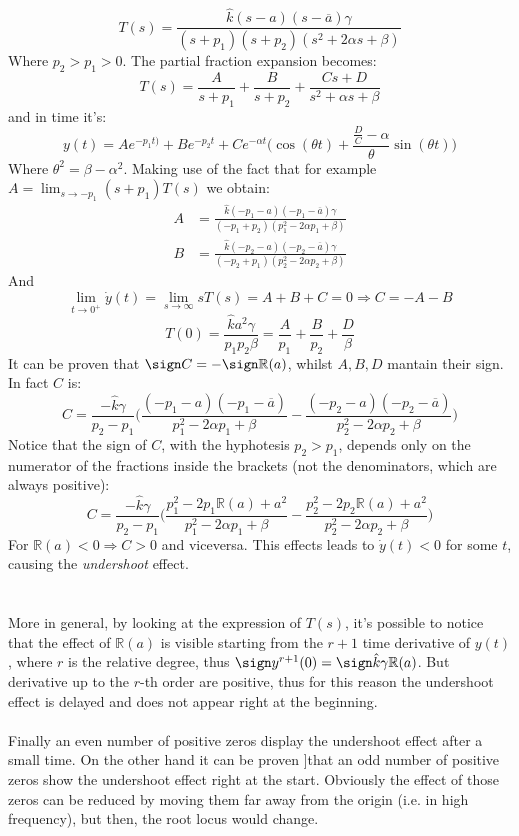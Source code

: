 $$T(s) = \frac{\hat{k}(s-a)(s-\overline{a})\gamma}{(s+p_{1})(s+p_{2})(s^2+2\alpha s+\beta)}
$$
Where $p_2>p_1 >0 $. The partial fraction expansion becomes:
$$T(s) = \frac{A}{s+p_1} + \frac{B}{s+p_2} +\frac{Cs+D}{s^2+\alpha s+\beta}$$
and in time it's:
$$y(t) = Ae^{-p_1 t)}+ Be^{-p_2 t} +Ce^{-\alpha t}\Big (\cos(\theta t)+ \frac{\frac{D}{C}-\alpha}{\theta} \sin(\theta t) \Big)$$
Where $\theta^2 =  \beta -\alpha^2$. 
Making use of the fact that for example $A = \lim_{s \to -p_1} (s+p_1)T(s)$ we obtain:
\begin{align*}A &= \frac{\hat{k}(-p_1-a)(-p_1-\overline{a})\gamma}{(-p_1+p_2)(p_1^2-2\alpha p_1+\beta)}\\
B &= \frac{\hat{k}(-p_2-a)(-p_2-\overline{a})\gamma}{(-p_2+p_1)(p_2^2-2\alpha p_2+\beta)}
\end{align*}
And $$\lim_{t \to 0^{+}} \dot{y}(t) = \lim_{s \to \infty} sT(s) = A+B+C=0 \Rightarrow C=-A-B$$
$$T(0)= \frac{\hat{k}a^2\gamma}{p_1 p_2 \beta } = \frac{A}{p_1} + \frac{B}{p_2} + \frac{D}{\beta}$$
It can be proven that $\sign C =  - \sign \mathbb{R}(a)$, whilst $A,B,D$ mantain their sign. In fact $C$ is:
$$C=\frac{-\hat{k}\gamma}{p_2-p_1} \Big( \frac{(-p_1-a)(-p_1-\overline{a})}{p_1^2-2\alpha p_1+\beta} -\frac{(-p_2-a)(-p_2-\overline{a})}{p_2^2-2\alpha p_2+\beta} \Big) $$
Notice that the sign of $C$, with the hyphotesis $p_2 > p_1$, depends only on the numerator of the fractions inside the brackets (not the denominators, which are always positive):
$$C=\frac{-\hat{k}\gamma}{p_2-p_1}\Big ( \frac{p_1^2 -2p_1 \mathbb{R}(a) +a^2}{p_1^2-2\alpha p_1+\beta} -\frac{p_2^2 -2p_2 \mathbb{R}(a) +a^2}{p_2^2-2\alpha p_2+\beta} \Big)$$
For $\mathbb{R}(a) < 0 \Rightarrow C > 0$ and viceversa. This effects leads to $\dot{y}(t) <0$ for some $t$, causing the \emph{undershoot} effect.  \\ \\ \\
More in general, by looking at the expression of $T(s)$, it's possible to notice that the effect of $\mathbb{R}(a)$ is visible starting from the $r+1$ time derivative of $y(t)$, where $r$ is the relative degree, thus $\sign y^{r+1}(0)  = \sign \hat{k}\gamma \mathbb{R}(a)$. But derivative up to the $r$-th order are positive, thus for this reason the undershoot effect is delayed and does not appear right at the beginning. \\ \\
Finally an even number of positive zeros display the undershoot effect  after a small time. On the other hand it can be proven  \cite{hoagg2006}]that an odd number of positive zeros show the undershoot effect right at the start. Obviously the effect of those zeros can be reduced by moving them far away from the origin (i.e. in high frequency), but then, the root locus would change.\\